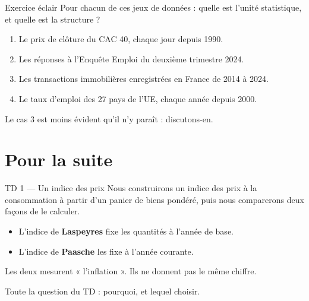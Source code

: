 \documentclass[10pt,aspectratio=169]{beamer}
\begin{document}
\begin{frame}{Exercice éclair}
Pour chacun de ces jeux de données : quelle est l'unité statistique, et quelle est la structure ?

\vspace{1.5em}
\begin{enumerate}
  \item Le prix de clôture du CAC 40, chaque jour depuis 1990.
  \item Les réponses à l'Enquête Emploi du deuxième trimestre 2024.
  \item Les transactions immobilières enregistrées en France de 2014 à 2024.
  \item Le taux d'emploi des 27 pays de l'UE, chaque année depuis 2000.
\end{enumerate}

\vspace{1.5em}
\small\color{CYgris}
Le cas 3 est moins évident qu'il n'y paraît : discutons-en.
\end{frame}

\section{Pour la suite}

\begin{frame}{TD 1 --- Un indice des prix}
Nous construirons un indice des prix à la consommation à partir d'un panier de biens pondéré, puis nous comparerons deux façons de le calculer.

\vspace{1.2em}
\begin{itemize}
  \item L'indice de \textbf{Laspeyres} fixe les quantités à l'année de base.
  \item L'indice de \textbf{Paasche} les fixe à l'année courante.
\end{itemize}

\vspace{1.2em}
Les deux mesurent « l'inflation ». Ils ne donnent pas le même chiffre.

\vspace{0.8em}
Toute la question du TD : \alert{pourquoi}, et lequel choisir.
\end{frame}
\end{document}
